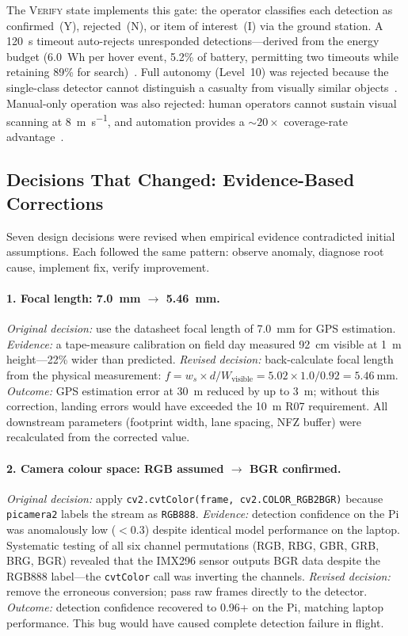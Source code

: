 The \textsc{Verify} state implements this gate: the operator classifies each detection as confirmed~(Y), rejected~(N), or item of interest~(I) via the ground station. A \SI{120}{\second} timeout auto-rejects unresponded detections---derived from the energy budget (\SI{6.0}{Wh} per hover event, 5.2\% of battery, permitting two timeouts while retaining 89\% for search)~\cite{goodrich2007human}. Full autonomy (Level~10) was rejected because the single-class detector cannot distinguish a casualty from visually similar objects~\cite{murphy2014, lyu2023uav_sar_survey}. Manual-only operation was also rejected: human operators cannot sustain visual scanning at \SI{8}{\metre\per\second}, and automation provides a ${\sim}20\times$ coverage-rate advantage~\cite{goodrich2008}.

\subsection{Decisions That Changed: Evidence-Based Corrections}\label{sec:decisions-changed}

Seven design decisions were revised when empirical evidence contradicted initial assumptions. Each followed the same pattern: observe anomaly, diagnose root cause, implement fix, verify improvement.

\paragraph{1. Focal length: \SI{7.0}{\milli\metre} $\rightarrow$ \SI{5.46}{\milli\metre}.}
\emph{Original decision:} use the datasheet focal length of \SI{7.0}{\milli\metre} for GPS estimation.
\emph{Evidence:} a tape-measure calibration on field day measured \SI{92}{\centi\metre} visible at \SI{1}{\metre} height---22\% wider than predicted.
\emph{Revised decision:} back-calculate focal length from the physical measurement: $f = w_s \times d / W_{\text{visible}} = 5.02 \times 1.0 / 0.92 = \SI{5.46}{\milli\metre}$.
\emph{Outcome:} GPS estimation error at \SI{30}{\metre} reduced by up to \SI{3}{\metre}; without this correction, landing errors would have exceeded the \SI{10}{\metre} R07 requirement. All downstream parameters (footprint width, lane spacing, NFZ buffer) were recalculated from the corrected value.

\paragraph{2. Camera colour space: RGB assumed $\rightarrow$ BGR confirmed.}
\emph{Original decision:} apply \texttt{cv2.cvtColor(frame, cv2.COLOR\_RGB2BGR)} because \texttt{picamera2} labels the stream as \texttt{RGB888}.
\emph{Evidence:} detection confidence on the Pi was anomalously low ($<$0.3) despite identical model performance on the laptop. Systematic testing of all six channel permutations (RGB, RBG, GBR, GRB, BRG, BGR) revealed that the IMX296 sensor outputs BGR data despite the RGB888 label---the \texttt{cvtColor} call was inverting the channels.
\emph{Revised decision:} remove the erroneous conversion; pass raw frames directly to the detector.
\emph{Outcome:} detection confidence recovered to 0.96+ on the Pi, matching laptop performance. This bug would have caused complete detection failure in flight.

